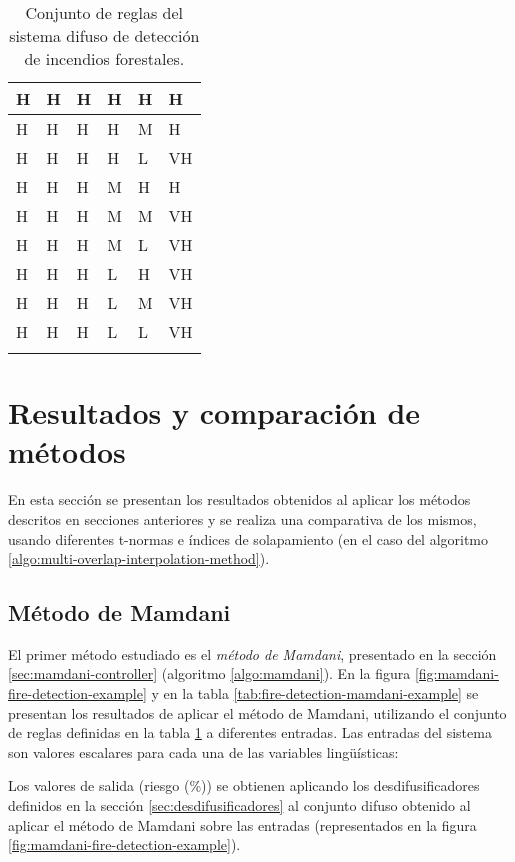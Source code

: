 \begin{center}
\begin{longtable}{| l | l | l | l | l | l |}
    H & H & H & H & H & H \\ \hline 
    H & H & H & H & M & H \\ \hline 
    H & H & H & H & L & VH \\ \hline 
    H & H & H & M & H & H \\ \hline 
    H & H & H & M & M & VH \\ \hline 
    H & H & H & M & L & VH \\ \hline 
    H & H & H & L & H & VH \\ \hline 
    H & H & H & L & M & VH \\ \hline 
    H & H & H & L & L & VH \\
    \hline
    \caption{Conjunto de reglas del sistema difuso de detección de incendios forestales.}
    \label{tab:fire-detection-rule-set}
    \end{longtable}
\end{center}

\section{Resultados y comparación de métodos}
En esta sección se presentan los resultados obtenidos al aplicar los métodos descritos en secciones anteriores y se realiza una comparativa de los mismos, usando diferentes t-normas e índices de solapamiento (en el caso del algoritmo \ref{algo:multi-overlap-interpolation-method}). 

\subsection{Método de Mamdani}
El primer método estudiado es el \emph{método de Mamdani}, presentado en la sección \ref{sec:mamdani-controller} (algoritmo \ref{algo:mamdani}). En la figura \ref{fig:mamdani-fire-detection-example} y en la tabla \ref{tab:fire-detection-mamdani-example} se presentan los resultados de aplicar el método de Mamdani, utilizando el conjunto de reglas definidas en la tabla \ref{tab:fire-detection-rule-set} a diferentes entradas. Las entradas del sistema son valores escalares para cada una de las variables lingüísticas:

\begin{center}
	
    \label{tab:fire-detection-mamdani-example}
\end{center}

Los valores de salida (riesgo (\%)) se obtienen aplicando los desdifusificadores definidos en la sección \ref{sec:desdifusificadores} al conjunto difuso obtenido al aplicar el método de Mamdani sobre las entradas (representados en la figura \ref{fig:mamdani-fire-detection-example}). 


